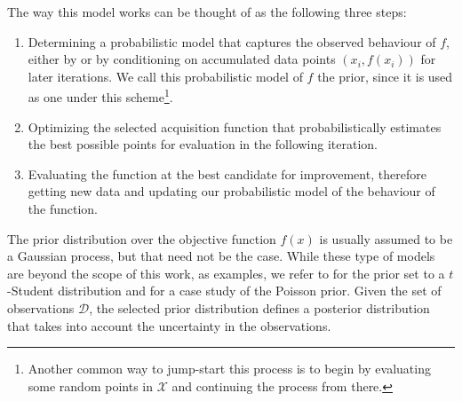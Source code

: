 The way this model works can be thought of as the following three steps: 

\begin{enumerate}
	\item Determining a probabilistic model that captures the observed behaviour of $f$, either by  or by conditioning on accumulated data points $(x_i, f(x_i))$ for later iterations. We call this probabilistic model of $f$ the prior, since it is used as one under this scheme\footnote{Another common way to jump-start this process is to begin by evaluating some random points in $\mathcal{X}$ and continuing the process from there.}.
	\item Optimizing the selected acquisition function  that probabilistically estimates the best possible points for evaluation in the following iteration. 
	\item Evaluating the function at the best candidate for improvement, therefore getting new data and updating our probabilistic model of the behaviour of the function. 
\end{enumerate}

The prior distribution over the objective function $f(x)$ is usually assumed to be a Gaussian process, but that need not be the case. While these type of models are beyond the scope of this work, as examples, we refer to \cite{shah2013bayesian} for the prior set to a $t$-Student distribution and \cite{wangpoisson} for a case study of the Poisson prior. Given the set of observations $\mathcal{D}$, the selected prior distribution defines a posterior distribution  that takes into account the uncertainty in the observations.

